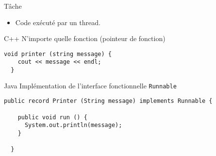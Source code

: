 
\begingroup

\begin{frame}[fragile]{Tâche}

  \begin{itemize}
  \item Code exécuté par un thread.
  \end{itemize}

  \begin{exampleblock}{C++}
    N'importe quelle fonction (pointeur de fonction)
    \begin{lstlisting}[numbers=none]
  void printer (string message) {
    cout << message << endl;
  }
    \end{lstlisting}
  \end{exampleblock}

  \begin{exampleblock}{Java}
  Implémentation de l'interface fonctionnelle \lstinline{Runnable}
     \begin{lstlisting}[numbers=none]
  public record Printer (String message) implements Runnable {

    public void run () {
      System.out.println(message);
    }

  }
    \end{lstlisting}
\end{exampleblock}
\end{frame}

\endgroup
\endinput
